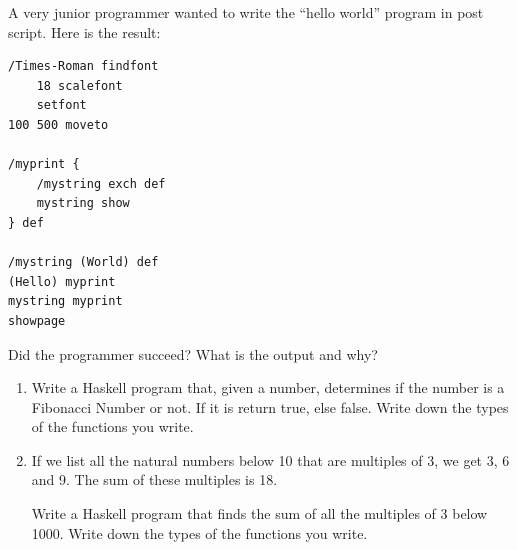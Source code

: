 \documentclass [11pt, a4wide, twoside]{article}
\begin{document}
\newpage

\noindent
%

A very junior programmer wanted to write the ``hello world'' program in post script. Here is the result: 

\begin{small}
\begin{verbatim}
/Times-Roman findfont
    18 scalefont
    setfont
100 500 moveto

/myprint {
    /mystring exch def
    mystring show
} def

/mystring (World) def
(Hello) myprint
mystring myprint
showpage
\end{verbatim}
\end{small}

\begin{myenumerate}
\item Did the programmer succeed? What is the output and why?
\end{myenumerate}




\newpage

\noindent
%
\begin{enumerate}
\item Write a Haskell program that, given a number, determines if the number is a Fibonacci Number or not. If it is return true, else false. Write down the types of the functions you write.
\vspace{9cm}
\item If we list all the natural numbers below 10 that are multiples of 3, we get 3, 6 and 9. The sum of these multiples is 18.

Write a Haskell program that finds the sum of all the multiples of 3 below 1000. Write down the types of the functions you write.
\vspace{6cm}
\end{enumerate}



\newpage
\end{document}
